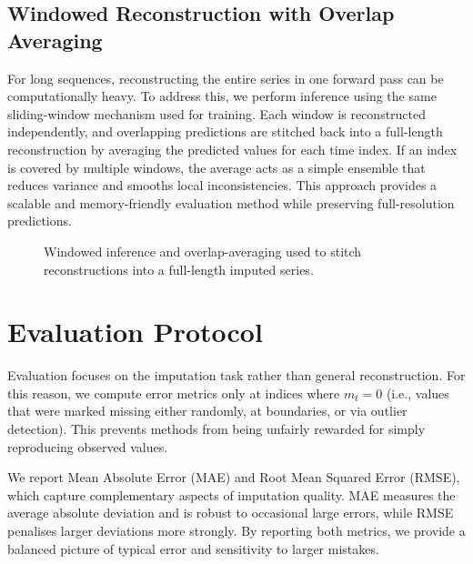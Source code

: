 \subsection{Windowed Reconstruction with Overlap Averaging}
For long sequences, reconstructing the entire series in one forward pass can be computationally heavy. To address this, we perform inference using the same sliding-window mechanism used for training. Each window is reconstructed independently, and overlapping predictions are stitched back into a full-length reconstruction by averaging the predicted values for each time index. If an index is covered by multiple windows, the average acts as a simple ensemble that reduces variance and smooths local inconsistencies. This approach provides a scalable and memory-friendly evaluation method while preserving full-resolution predictions.

\begin{figure}[ht]
	\centering
	\caption{Windowed inference and overlap-averaging used to stitch reconstructions into a full-length imputed series.}
	\label{fig:window-stitching}
\end{figure}

\section{Evaluation Protocol}
Evaluation focuses on the imputation task rather than general reconstruction. For this reason, we compute error metrics only at indices where $m_t=0$ (i.e., values that were marked missing either randomly, at boundaries, or via outlier detection). This prevents methods from being unfairly rewarded for simply reproducing observed values.

We report Mean Absolute Error (MAE) and Root Mean Squared Error (RMSE), which capture complementary aspects of imputation quality. MAE measures the average absolute deviation and is robust to occasional large errors, while RMSE penalises larger deviations more strongly. By reporting both metrics, we provide a balanced picture of typical error and sensitivity to larger mistakes.

